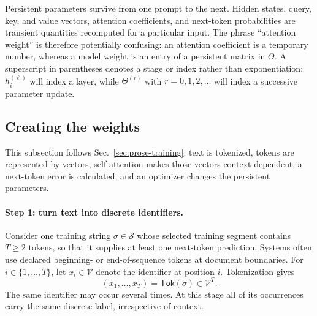 \documentclass[
  aps,
  reprint,
  superscriptaddress,
  floatfix,
  nofootinbib,
  longbibliography
]{revtex4-2}
\begin{document}
Persistent parameters survive from one prompt to the next.  Hidden states,
query, key, and value vectors, attention coefficients, and next-token
probabilities are transient quantities recomputed for a particular input.  The
phrase ``attention weight'' is therefore potentially confusing: an attention
coefficient is a temporary number, whereas a model weight is an entry of a
persistent matrix in $\Theta$.  A superscript in parentheses denotes a stage
or index rather than exponentiation: $h_i^{(\ell)}$ will index a layer, while
$\Theta^{(r)}$ with $r=0,1,2,\ldots$ will index a successive parameter update.

\subsection{Creating the weights}
\label{app:training}

This subsection follows Sec.~\ref{sec:prose-training}: text is tokenized,
tokens are represented by vectors, self-attention makes those vectors
context-dependent, a next-token error is calculated, and an optimizer changes
the persistent parameters.

\paragraph{Step 1: turn text into discrete identifiers.}
Consider one training string $\sigma\in\mathcal S$ whose selected training
segment contains $T\geq2$ tokens, so that it supplies at least one next-token
prediction.  Systems often use declared beginning- or end-of-sequence tokens
at document boundaries.  For $i\in\{1,\ldots,T\}$, let
$x_i\in\mathcal V$ denote the identifier at position $i$.  Tokenization gives
\begin{equation}
\label{eq:app-forward-map}
(x_1,\ldots,x_T)=\mathsf{Tok}(\sigma)
\in\mathcal V^T.
\end{equation}
The same identifier may occur several times.  At this stage all
of its occurrences carry the same discrete label, irrespective of context.
\end{document}
